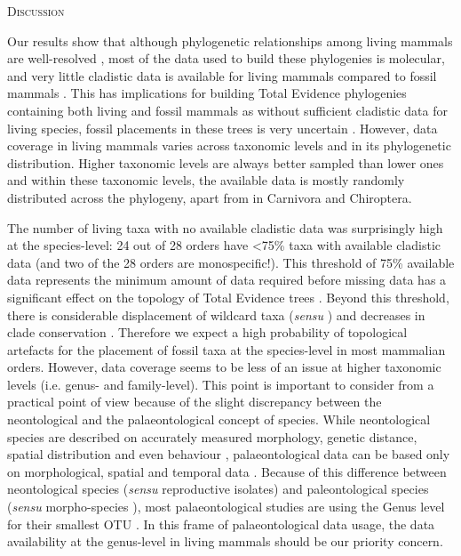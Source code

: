 \documentclass[12pt,letterpaper]{article}
\renewcommand{\section}[1]{%
\bigskip
\begin{center}
\begin{Large}
\normalfont\scshape #1
\medskip
\end{Large}
\end{center}}
\begin{document}
%
%

\section{Discussion}
Our results show that although phylogenetic relationships among living mammals are well-resolved \citep[e.g.][]{FritzTree,meredithimpacts2011,May-Collado-PeerJ}, most of the data used to build these phylogenies is molecular, and very little cladistic data is available for living mammals compared to fossil mammals \citep[e.g.][]{O'Leary08022013,ni2013oldest}.
This has implications for building Total Evidence phylogenies containing both living and fossil mammals as without sufficient cladistic data for living species, fossil placements in these trees is very uncertain \citep{GuillermeCooper}.
However, data coverage in living mammals varies across taxonomic levels and in its phylogenetic distribution.
Higher taxonomic levels are always better sampled than lower ones and within these taxonomic levels, the available data is mostly randomly distributed across the phylogeny, apart from in Carnivora and Chiroptera.

The number of living taxa with no available cladistic data was surprisingly high at the species-level: 24 out of 28 orders have \textless 75\% taxa with available cladistic data (and two of the 28 orders are monospecific!).
This threshold of 75\% available data represents the minimum amount of data required before missing data has a significant effect on the topology of Total Evidence trees \citep{GuillermeCooper}.
Beyond this threshold, there is considerable displacement of wildcard taxa (\textit{sensu} \citep{kearneyfragmentary2002}) and decreases in clade conservation \citep{GuillermeCooper}.
Therefore we expect a high probability of topological artefacts for the placement of fossil taxa at the species-level in most mammalian orders.
However, data coverage seems to be less of an issue at higher taxonomic levels (i.e. genus- and family-level).
This point is important to consider from a practical point of view because of the slight discrepancy between the neontological and the palaeontological concept of species.
While neontological species are described on accurately measured morphology, genetic distance, spatial distribution and even behaviour \citep[e.g.][]{kellymolecular2014}, palaeontological data can be based only on morphological, spatial and temporal data \citep[e.g.][]{ni2013oldest}.
Because of this difference between neontological species (\textit{sensu} reproductive isolates) and paleontological species (\textit{sensu} morpho-species %
), most palaeontological studies are using the Genus level for their smallest OTU \citep[e.g.][]{ni2013oldest,O'Leary08022013}.
In this frame of palaeontological data usage, the data availability at the genus-level in living mammals should be our priority concern.
\end{document}
